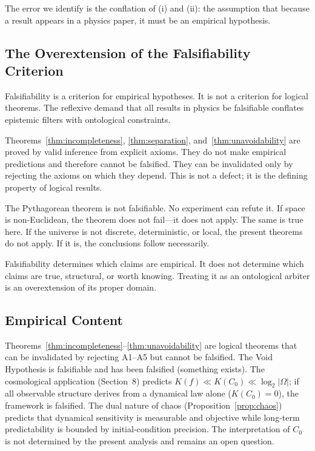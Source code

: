 \documentclass[12pt]{article}
\theoremstyle{plain}
\theoremstyle{definition}
\theoremstyle{remark}
\begin{document}
\medskip
The error we identify is the conflation of (i) and (ii): the assumption that because a result appears in a physics paper, it must be an empirical hypothesis.

\subsection{The Overextension of the Falsifiability Criterion}

Falsifiability is a criterion for empirical hypotheses. It is not a criterion for logical theorems. The reflexive demand that all results in physics be falsifiable conflates epistemic filters with ontological constraints.

Theorems~\ref{thm:incompleteness}, \ref{thm:separation}, and~\ref{thm:unavoidability} are proved by valid inference from explicit axioms. They do not make empirical predictions and therefore cannot be falsified. They can be invalidated only by rejecting the axioms on which they depend. This is not a defect; it is the defining property of logical results.

The Pythagorean theorem is not falsifiable. No experiment can refute it. If space is non-Euclidean, the theorem does not fail---it does not apply. The same is true here. If the universe is not discrete, deterministic, or local, the present theorems do not apply. If it is, the conclusions follow necessarily.

Falsifiability determines which claims are empirical. It does not determine which claims are true, structural, or worth knowing. Treating it as an ontological arbiter is an overextension of its proper domain.

\subsection{Empirical Content}

Theorems~\ref{thm:incompleteness}--\ref{thm:unavoidability} are logical theorems that can be invalidated by rejecting A1--A5 but cannot be falsified. The Void Hypothesis is falsifiable and has been falsified (something exists). The cosmological application (Section~8) predicts $K(f) \ll K(C_0) \ll \log_2|\Omega|$; if all observable structure derives from a dynamical law alone ($K(C_0) = 0$), the framework is falsified. The dual nature of chaos (Proposition~\ref{prop:chaos}) predicts that dynamical sensitivity is measurable and objective while long-term predictability is bounded by initial-condition precision. The interpretation of $C_0$ is not determined by the present analysis and remains an open question.
\end{document}
